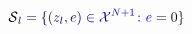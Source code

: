 \documentclass[12pt]{article}
\begin{document}
\makeatletter
\renewcommand*{\@textcolor}[3]{%
  \protect\leavevmode
  \begingroup
    \color#1{#2}#3%
  \endgroup
}
\makeatother
\begin{displaymath}
\mathcal { \mathcolor[RGB]{0,0,15}{S} } _ { \mathcolor[RGB]{0,0,30}{l} } \mathcolor[RGB]{0,0,45}{=} \mathcolor[RGB]{0,0,60}{\{} \mathcolor[RGB]{0,0,75}{(} \mathcolor[RGB]{0,0,90}{z} _ { \mathcolor[RGB]{0,0,105}{l} } \mathcolor[RGB]{0,0,120}{,} \mathcolor[RGB]{0,0,135}{e} \mathcolor[RGB]{0,0,150}{)} \mathcolor[RGB]{0,0,165}{\in} \mathcal { \mathcolor[RGB]{0,0,180}{X} } ^ { \mathcolor[RGB]{0,0,195}{N} \mathcolor[RGB]{0,0,210}{+} \mathcolor[RGB]{0,0,225}{1} } \mathcolor[RGB]{0,0,240}{\colon} \mathcolor[RGB]{0,0,255}{e} \mathcolor[RGB]{0,15,0}{=} \mathcolor[RGB]{0,15,15}{0} \mathcolor[RGB]{0,15,30}{\}}
\end{displaymath}
\end{document}
